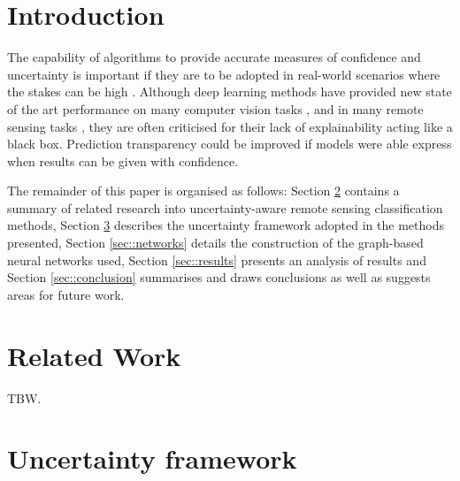 \documentclass[
twocolumn,
]{ceurart}
\begin{document}
\section{Introduction}
The capability of algorithms to provide accurate measures of confidence and uncertainty is important if they are to be adopted in real-world scenarios where the stakes can be high \cite{Goodman_Flaxman_2017}.
Although deep learning methods have provided new state of the art performance on many computer vision tasks \cite{lecun2015deeplearning}, and in many remote sensing tasks \cite{zhang2016deep}, they are often criticised for their lack of explainability \cite{pmlr_v70_guo17a} acting like a black box.
Prediction transparency could be improved if models were able express when results can be given with confidence.

The remainder of this paper is organised as follows: Section \ref{sec::related_work} contains a summary of related research into uncertainty-aware remote sensing classification methods, Section \ref{sec::unc_framework} describes the uncertainty framework adopted in the methods presented, Section \ref{sec::networks} details the construction of the graph-based neural networks used, Section \ref{sec::results} presents an analysis of results and Section \ref{sec::conclusion} summarises and draws conclusions as well as suggests areas for future work.

\section{Related Work}
\label{sec::related_work}
TBW.

\section{Uncertainty framework}
\label{sec::unc_framework}
\end{document}

